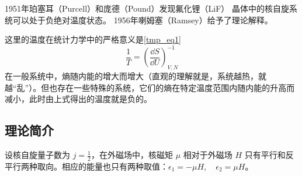 
1951年珀塞耳（Purcell）和庞德（Pound）发现氟化锂（LiF） 晶体中的核自旋系统可以处于负绝对温度状态。
1956年喇姆塞（Ramsey）给予了理论解释。\cite{热统}

这里的温度在统计力学中的严格意义是\autoref{tmp_eq1}~
\begin{equation}
\frac{1}{T}=\left(\frac{\dd S}{\dd U}\right)_{V,N}^{-1}
\end{equation}
在一般系统中，熵随内能的增大而增大（直观的理解就是，系统越热，就越“乱”）。但也存在一些特殊的系统，它们的熵在特定温度范围内随内能的升高而减小，此时由上式得出的温度就是负的。

\subsection{理论简介}
设核自旋量子数为 $j=\frac{1}{2}$，在外磁场中，核磁矩 $\mu$ 相对于外磁场 $H$ 只有平行和反平行两种取向。相应的能量也只有两种取值：$\epsilon_1=-\mu H,\quad \epsilon_2=\mu H$。